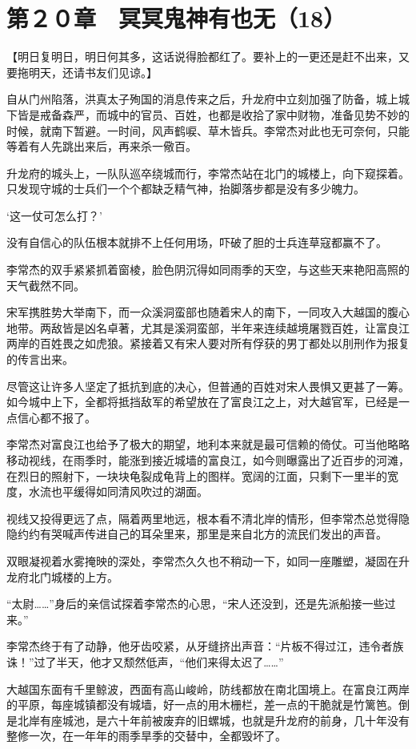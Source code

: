 \section{第２０章　冥冥鬼神有也无（18）}

【明日复明日，明日何其多，这话说得脸都红了。要补上的一更还是赶不出来，又要拖明天，还请书友们见谅。】

自从门州陷落，洪真太子殉国的消息传来之后，升龙府中立刻加强了防备，城上城下皆是戒备森严，而城中的官员、百姓，也都是收拾了家中财物，准备见势不妙的时候，就南下暂避。一时间，风声鹤唳、草木皆兵。李常杰对此也无可奈何，只能等着有人先跳出来后，再来杀一儆百。

升龙府的城头上，一队队巡卒绕城而行，李常杰站在北门的城楼上，向下窥探着。只发现守城的士兵们一个个都缺乏精气神，抬脚落步都是没有多少魄力。

‘这一仗可怎么打？’

没有自信心的队伍根本就排不上任何用场，吓破了胆的士兵连草寇都赢不了。

李常杰的双手紧紧抓着窗棱，脸色阴沉得如同雨季的天空，与这些天来艳阳高照的天气截然不同。

宋军携胜势大举南下，而一众溪洞蛮部也随着宋人的南下，一同攻入大越国的腹心地带。两敌皆是凶名卓著，尤其是溪洞蛮部，半年来连续越境屠戮百姓，让富良江两岸的百姓畏之如虎狼。紧接着又有宋人要对所有俘获的男丁都处以刖刑作为报复的传言出来。

尽管这让许多人坚定了抵抗到底的决心，但普通的百姓对宋人畏惧又更甚了一筹。如今城中上下，全都将抵挡敌军的希望放在了富良江之上，对大越官军，已经是一点信心都不报了。

李常杰对富良江也给予了极大的期望，地利本来就是最可信赖的倚仗。可当他略略移动视线，在雨季时，能涨到接近城墙的富良江，如今则曝露出了近百步的河滩，在烈日的照射下，一块块龟裂成龟背上的图样。宽阔的江面，只剩下一里半的宽度，水流也平缓得如同清风吹过的湖面。

视线又投得更远了点，隔着两里地远，根本看不清北岸的情形，但李常杰总觉得隐隐约约有哭喊声传进自己的耳朵里来，那里是来自北方的流民们发出的声音。

双眼凝视着水雾掩映的深处，李常杰久久也不稍动一下，如同一座雕塑，凝固在升龙府北门城楼的上方。

“太尉……”身后的亲信试探着李常杰的心思，“宋人还没到，还是先派船接一些过来。”

李常杰终于有了动静，他牙齿咬紧，从牙缝挤出声音：“片板不得过江，违令者族诛！”过了半天，他才又颓然低声，“他们来得太迟了……”

大越国东面有千里鲸波，西面有高山峻岭，防线都放在南北国境上。在富良江两岸的平原，每座城镇都没有城墙，好一点的用木栅栏，差一点的干脆就是竹篱笆。倒是北岸有座城池，是六十年前被废弃的旧螺城，也就是升龙府的前身，几十年没有整修一次，在一年年的雨季旱季的交替中，全都毁坏了。

